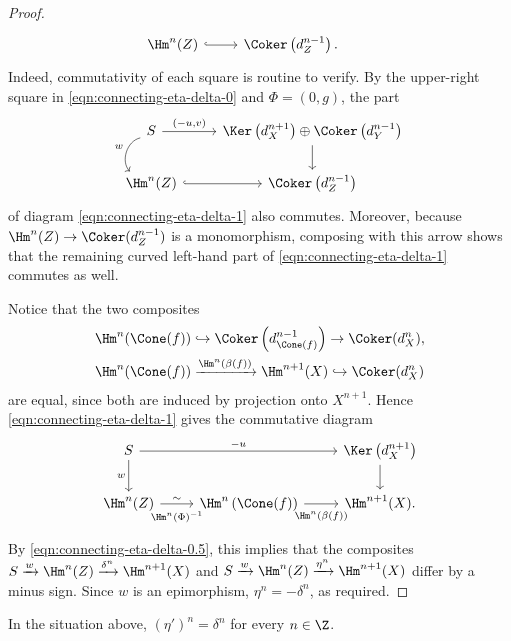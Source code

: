 \begin{proof}
\begin{equation}
\begin{tikzcd}
		\Hm^n(Z) \arrow[hookrightarrow, r] & \Coker\left( d_Z^{n-1} \right) . &
	\end{tikzcd}\end{equation}
	Indeed, commutativity of each square is routine to verify. By the
	upper-right square in \eqref{eqn:connecting-eta-delta-0} and
	$\Phi=(0,g)$, the part
	\[\begin{tikzcd}
		S \arrow[r, "{(-u, v)}"]  \arrow[bend right=60, d, "w"'] & \Ker\left( d_X^{n+1} \right) \oplus \Coker\left( d_Y^{n-1} \right) \arrow[d] \\
		\Hm^n(Z) \arrow[hookrightarrow, r] & \Coker\left( d_Z^{n-1} \right)
	\end{tikzcd}\]
	of diagram \eqref{eqn:connecting-eta-delta-1} also commutes. Moreover,
	because $\Hm^n(Z)\to\Coker(d_Z^{n-1})$ is a monomorphism, composing with
	this arrow shows that the remaining curved left-hand part of
	\eqref{eqn:connecting-eta-delta-1} commutes as well.

	Notice that the two composites
	\[
	\begin{aligned}
		\Hm^n(\Cone(f)) &\hookrightarrow
		\Coker \left( d_{\Cone(f)}^{n-1} \right)
		\to \Coker(d_X^n), \\
		\Hm^n(\Cone(f)) &\xrightarrow{\Hm^n(\beta(f))}
		\Hm^{n+1}(X) \hookrightarrow \Coker(d_X^n)
	\end{aligned}
	\]
	are equal, since both are induced by projection onto $X^{n+1}$. Hence
	\eqref{eqn:connecting-eta-delta-1} gives the commutative diagram
	\[\begin{tikzcd}
		S \arrow[d, "w"'] \arrow[rr, "-u"] & & \Ker\left( d_X^{n+1} \right) \arrow[d] \\
		\Hm^n(Z) \arrow[r, "\sim", "{\Hm^n(\Phi)^{-1}}"' inner sep=0.5em] & \Hm^n\left( \Cone(f) \right) \arrow[r, "{\Hm^n(\beta(f))}"' inner sep=0.5em] & \Hm^{n+1}(X) .
	\end{tikzcd}\]
	By \eqref{eqn:connecting-eta-delta-0.5}, this implies that the composites
	$S\xrightarrow{w}\Hm^n(Z)\xrightarrow{\delta^n}\Hm^{n+1}(X)$ and
	$S\xrightarrow{w}\Hm^n(Z)\xrightarrow{\eta^n}\Hm^{n+1}(X)$ differ by a
	minus sign. Since $w$ is an epimorphism, $\eta^n=-\delta^n$, as required.
\end{proof}

\begin{corollary}\label{prop:connecting-eta-delta-2}
	In the situation above, $(\eta')^n=\delta^n$ for every $n\in\Z$.
\end{corollary}

